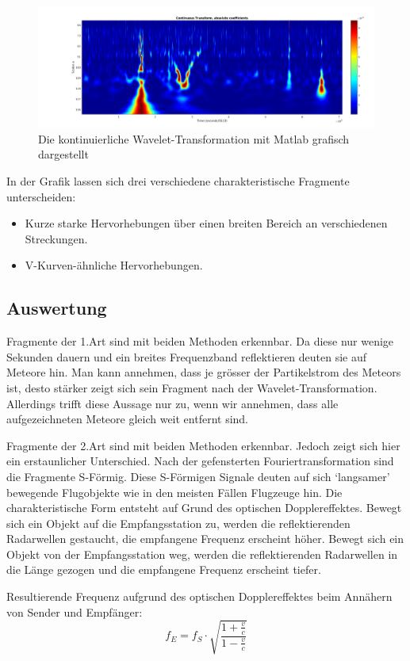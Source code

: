 \begin{refsection}
\begin{figure}
	\centering
	\includegraphics[width=0.7\linewidth]{papers/meteor/images/signal_wscalo.png}
	\caption{Die kontinuierliche Wavelet-Transformation mit Matlab grafisch dargestellt}
	\label{fig:signalmitwscalo}
\end{figure}
In der Grafik lassen sich drei verschiedene charakteristische Fragmente unterscheiden:
\begin{itemize}
	\item Kurze starke Hervorhebungen über einen breiten Bereich an verschiedenen Streckungen.
	\item V-Kurven-ähnliche  Hervorhebungen.
\end{itemize}

\subsection{Auswertung}
Fragmente der 1.Art sind mit beiden Methoden erkennbar.
Da diese nur wenige Sekunden dauern und ein breites Frequenzband reflektieren deuten sie auf Meteore hin.
Man kann annehmen, dass je grösser der Partikelstrom des Meteors ist, desto stärker zeigt sich sein Fragment nach der Wavelet-Transformation.
Allerdings trifft diese Aussage nur zu, wenn wir annehmen, dass alle aufgezeichneten Meteore gleich weit entfernt sind.

Fragmente der 2.Art sind mit beiden Methoden erkennbar.
Jedoch zeigt sich hier ein erstaunlicher Unterschied.
Nach der gefensterten Fouriertransformation sind die Fragmente S-Förmig.
Diese S-Förmigen Signale deuten auf sich `langsamer' bewegende Flugobjekte wie in den meisten Fällen Flugzeuge hin.
Die charakteristische Form entsteht auf Grund des optischen Dopplereffektes. 
Bewegt sich ein Objekt auf die Empfangsstation zu, werden die reflektierenden Radarwellen gestaucht, die empfangene Frequenz erscheint höher.
Bewegt sich ein Objekt von der Empfangsstation weg, werden die reflektierenden Radarwellen in die Länge gezogen und die empfangene Frequenz erscheint tiefer.

Resultierende Frequenz aufgrund des optischen Dopplereffektes beim Annähern von Sender und Empfänger:
\[
f_E
=
f_S\cdot\sqrt{\frac{1+\frac{v}{c}}{1-\frac{v}{c}}}
\]


\end{refsection}
